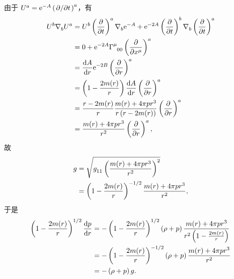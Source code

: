 \begin{xiti}
	\begin{zm}
		由于 $\tensor{U}{^a} = \e{-A} \tensor{\left( \pdv*{t} \right)}{^a}$，有
		\begin{align*}
			\tensor{U}{^b} \tensor{\nabla}{_b} \tensor{U}{^a} &= \tensor{U}{^b} \tensor{\left( \pdv{t} \right)}{^a} \Nabla{b} \e{-A} + \e{-2A} \tensor{\left( \pdv{t} \right)}{^b} \Nabla{b} \tensor{\left( \pdv{t} \right)}{^a}\\
			&= 0 + \e{-2A} \ChristoffelSymbol{\mu}{0}{0} \tensor{\left( \pdv{x^\mu} \right)}{^a}\\
			&= \dv{A}{r} \e{-2B} \tensor{\left( \pdv{r} \right)}{^a}\\
			&= \left( 1- \frac{2m(r)}{r} \right) \dv{A}{r} \tensor{\left( \pdv{r} \right)}{^a}\\
			&= \frac{r - 2m(r)}{r} \frac{m(r) + 4 \pi p r^3}{r \left( r - 2 m(r) \right)} \tensor{\left( \pdv{r} \right)}{^a}\\
			&= \frac{m(r) + 4 \pi p r^3}{r^2} \tensor{\left( \pdv{r} \right)}{^a},
		\end{align*}
		故
		\begin{align*}
			g &= \sqrt{\tensor{g}{_1_1} \left( \frac{m(r) + 4 \pi p r^3}{r^2} \right)^2}\\
			&= \left( 1 - \frac{2 m(r)}{r} \right)^{-1/2} \frac{m(r) + 4 \pi p r^3}{r^2},
		\end{align*}
		于是
		\begin{align*}
			\left( 1 - \frac{2 m(r)}{r} \right)^{1/2} \dv{p}{r} &= - \left( 1 - \frac{2 m(r)}{r} \right)^{1/2} \left( \rho + p \right) \frac{m(r) + 4 \pi p r^3}{r^2 \left( 1 - \frac{2 m(r)}{r} \right)}\\
			&= - \left( 1 - \frac{2 m(r)}{r} \right)^{-1/2} \left( \rho + p \right) \frac{m(r) + 4 \pi p r^3}{r^2}\\
			&= - \left( \rho + p \right) g.
		\end{align*}
	\end{zm}
\end{xiti}
